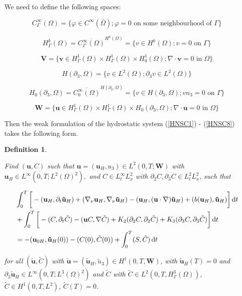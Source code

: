 \documentclass[11pt]{article}
\newtheorem{definition}{Definition}
\newcommand*\diff{\mathop{}\!\mathrm{d}}
\begin{document}
  We need to define the following spaces:
  
  \[ C^{\infty}_\Gamma (\Omega) = \{ \varphi \in C^\infty (\bar{\Omega}); \varphi = 0 \text{ on some neighbourhood of } \Gamma\} \]
  
  \[ H^k_{\Gamma} (\Omega) = \overline{C_\Gamma ^ \infty (\Omega)} ^ {H^k (\Omega)} = \{ v \in H^k(\Omega); v=0 \text{ on } \Gamma \} \]
  
  \[ \mathbf{V} = \{ \mathbf{v} \in  H^1_{\Gamma} (\Omega) \times H^1_{\Gamma} (\Omega) \times H^1_0 (\Omega); \nabla \cdot \mathbf{v} = 0 \text{ in } \Omega \} \]
  
  \[ H (\partial_3, \Omega) = \{ v \in L^2(\Omega); \partial_3 v \in L^2 (\Omega)\} \]
  
  \[ H_0 (\partial_3, \Omega) = \overline{C_0 ^\infty (\Omega)}^{H (\partial_3, \Omega)} = \{ v \in H(\partial_3, \Omega); v n_3 = 0 \text{ on } \Gamma \} \]
  
  \[ \mathbf{W} = \{ \mathbf{u} \in  H^1_{\Gamma} (\Omega) \times H^1_{\Gamma} (\Omega) \times H_0 (\partial_3, \Omega); \nabla \cdot \mathbf{u} = 0 \text{ in } \Omega \} \]
  
  Then the weak formulation of the hydrostatic system (\ref{HNSC1}) - (\ref{HNSC8}) takes the following form.
  
  \begin{definition} \label{definitionhydrostaticWF}
  
  Find $(\mathbf{u}, C)$ such that $\mathbf{u} = (\mathbf{u}_H, u_3) \in L^2 (0, T; \mathbf{W})$ with $\mathbf{u}_H \in L^\infty (0,T; L^2(\Omega)^2),$ and $C \in L_t^\infty L_x^2$ with $\partial_2 C, \partial_3 C \in L^2_t L^2_x$, such that
  
  \begin{equation}
    \begin{split}
      & \int_0^T \bigg[ -(\mathbf{u}_H, \partial_t \mathbf{\tilde{u}}_H) + (\nabla_\nu \mathbf{u}_H, \nabla_\nu \mathbf{\tilde{u}}_H) - (\mathbf{u}_H, (\mathbf{u} \cdot \nabla) \mathbf{\tilde{u}}_H) + (b(\mathbf{u}_H), \mathbf{\tilde{u}}_H) \bigg ] \diff t \\
      &+ \int_0^T \bigg[ -(C, \partial_t \tilde{C}) -(\mathbf{u}C, \nabla \tilde{C}) + K_2 (\partial_2 C, \partial_2 \tilde{C}) + K_3 (\partial_3 C, \partial_3 \tilde{C}) \bigg ] \diff t \\
      & = - (\mathbf{u}_{0H}, \mathbf{\tilde{u}}_H(0)) - (C(0), \tilde{C}(0)) + \int_0^T (S,\tilde{C}) \diff t \raisetag{20pt}\label{hydrostaticWF}
    \end{split}
  \end{equation}
  
  for all $(\mathbf{\tilde{u}}, \tilde{C})$ with $\mathbf{\tilde{u}} = (\mathbf{\tilde{u}}_H, \tilde{u}_3) \in H^1 (0,T, \mathbf{W})$, with $\mathbf{\tilde{u}}_H (T) = 0$ and $\partial_3 \mathbf{\tilde{u}}_H \in L^\infty (0, T; L^3 (\Omega)^2)$ and $\tilde{C}$ with $\tilde{C} \in L^2 (0,T, H^3_{\Gamma} (\Omega))$, $\tilde{C} \in H^1 (0,T, L^2)$, $\tilde{C} (T) = 0$. 
  
  \end{definition}
  
\end{document}

